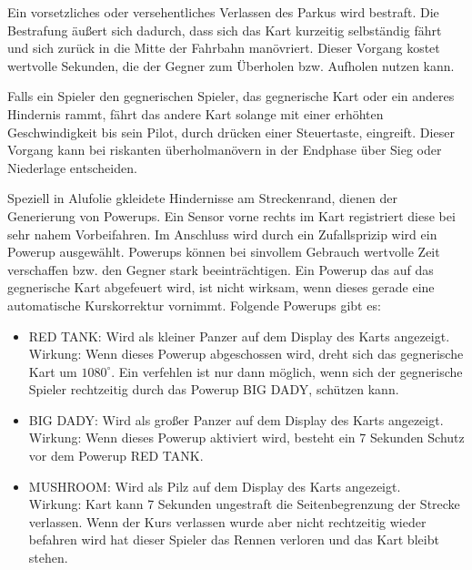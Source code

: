 Ein vorsetzliches oder versehentliches Verlassen des Parkus wird bestraft. Die Bestrafung äußert sich dadurch, dass sich das Kart kurzeitig selbständig fährt und sich zurück in die Mitte der Fahrbahn manövriert. Dieser Vorgang kostet wertvolle Sekunden, die der Gegner zum Überholen bzw. Aufholen nutzen kann. 

Falls ein Spieler den gegnerischen Spieler, das gegnerische Kart oder ein anderes Hindernis rammt, fährt das andere Kart solange mit einer erhöhten Geschwindigkeit bis sein Pilot, durch drücken einer Steuertaste, eingreift. Dieser Vorgang kann bei riskanten überholmanövern in der Endphase über Sieg oder Niederlage entscheiden.    

Speziell in Alufolie gkleidete Hindernisse am Streckenrand, dienen der Generierung von Powerups. Ein Sensor vorne rechts im Kart registriert diese bei sehr nahem Vorbeifahren. Im Anschluss wird durch ein Zufallsprizip wird ein Powerup ausgewählt. Powerups können bei sinvollem Gebrauch wertvolle Zeit verschaffen bzw. den Gegner stark beeinträchtigen. Ein Powerup das auf das gegnerische Kart abgefeuert wird, ist  nicht wirksam, wenn dieses gerade eine automatische Kurskorrektur vornimmt. Folgende Powerups gibt es: 

\begin{itemize}
	\item RED TANK: Wird als kleiner Panzer auf dem Display des Karts angezeigt.\\Wirkung: Wenn dieses Powerup abgeschossen wird, dreht sich das gegnerische Kart um $1080^\circ$. Ein verfehlen ist nur dann möglich, wenn sich der gegnerische Spieler rechtzeitig durch das Powerup BIG DADY, schützen kann.  
	\item BIG DADY: Wird als großer Panzer auf dem Display des Karts angezeigt.
	\\Wirkung: Wenn dieses Powerup aktiviert wird, besteht ein 7 Sekunden Schutz vor  
	dem Powerup RED TANK. 
	\item MUSHROOM: Wird als Pilz auf dem Display des Karts angezeigt. 
	\\Wirkung: Kart kann 7 Sekunden ungestraft die Seitenbegrenzung der Strecke verlassen. 		
	Wenn der Kurs verlassen wurde aber nicht rechtzeitig wieder befahren wird hat dieser 	
	Spieler das Rennen verloren und das Kart bleibt stehen.
\end{itemize}


 



































